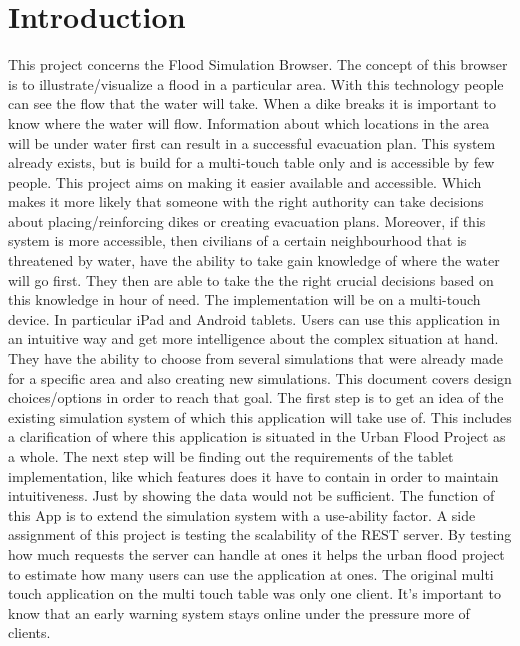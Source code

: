 \section{Introduction}
This project concerns the Flood Simulation Browser. The concept of this browser is to illustrate/visualize a flood in a particular area. With this technology people can see the flow that the water will take. When a dike breaks it is important to know where the water will flow. Information about which locations in the area will be under water first can result in a successful evacuation plan. This system already exists, but is build for a multi-touch table only and is accessible by few people. This project aims on making it easier available and accessible. Which makes it more likely that someone with the right authority can take decisions about placing/reinforcing dikes or creating evacuation plans. Moreover, if this system is more accessible, then civilians of a certain neighbourhood that is threatened by water, have the ability to take gain knowledge of where the water will go first. They then are able to take the the right crucial decisions based on this knowledge in hour of need.
The implementation will be on a multi-touch device. In particular iPad and Android tablets. Users can use this application in an intuitive way and get more intelligence about the complex situation at hand. They have the ability to choose from several simulations that were already made for a specific area and also creating new simulations.
This document covers design choices/options in order to reach that goal. The first step is to get an idea of the existing simulation system of which this application will take use of. This includes a clarification of where this application is situated in the Urban Flood Project as a whole. The next step will be finding out the requirements of the tablet implementation, like which features does it have to contain in order to maintain intuitiveness. Just by showing the data would not be sufficient. The function of this App is to extend the simulation system with a use-ability factor.
A side assignment of this project is testing the scalability of the REST server. By testing how much requests the server can handle at ones it helps the urban flood project to estimate how many users can use the application at ones. The original multi touch application on the multi touch table was only one client. It's important to know that an early warning system stays online under the pressure more of clients.

